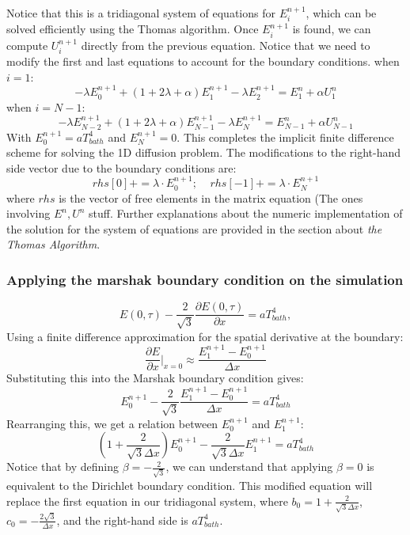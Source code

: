 \documentclass{article}
\begin{document}
Notice that this is a tridiagonal system of equations for $E_i^{n+1}$, 
which can be solved efficiently using the Thomas algorithm. 
Once $E_i^{n+1}$ is found, we can compute $U_i^{n+1}$ directly from the previous equation. 
Notice that we need to modify the first and last equations to account for the boundary conditions.
when $i=1$:
\begin{equation}
    -\lambda E_0^{n+1}+(1 + 2\lambda + \alpha) E_1^{n+1} - \lambda E_2^{n+1} = E_1^n + \alpha U_1^n
\end{equation}
when $i=N-1$:
\begin{equation}
    -\lambda E_{N-2}^{n+1} + (1 + 2\lambda + \alpha) E_{N-1}^{n+1} - \lambda E_N^{n+1} = E_{N-1}^n + \alpha U_{N-1}^n
\end{equation}
With $E_0^{n+1} = aT_{bath}^4$ and $E_N^{n+1} = 0$.
This completes the implicit finite difference scheme for solving the 1D diffusion problem.
The modifications to the right-hand side vector due to the boundary conditions are:
\begin{equation}
rhs[0] += \lambda \cdot E_0^{n+1}; \;\;\;\; rhs[-1] += \lambda \cdot E_N^{n+1}
\end{equation}
where $rhs$ is the vector of free elements in the matrix equation (The ones involving $E^n,U^n$ stuff. 
Further explanations about the numeric implementation of the solution for the system of equations are provided in the section about \textit{the Thomas Algorithm}.
\subsubsection*{Applying the marshak boundary condition on the simulation}
\begin{equation}
E(0,\tau)-  \frac{2}{\sqrt3} \frac{\partial E(0,\tau)}{\partial x} = aT_{bath}^4,
\end{equation}
Using a finite difference approximation for the spatial derivative at the boundary:
\begin{equation}
\frac{\partial E}{\partial x}|_{x=0} \approx \frac{E_1^{n+1} - E_0^{n+1}}{\Delta x}
\end{equation}
Substituting this into the Marshak boundary condition gives:
\begin{equation}
E_0^{n+1} - \frac{2}{\sqrt3} \frac{E_1^{n+1} - E_0^{n+1}}{\Delta x} = aT_{bath}^4
\end{equation}
Rearranging this, we get a relation between $E_0^{n+1}$ and $E_1^{n+1}$:
\begin{equation}
\left(1 + \frac{2}{\sqrt3\Delta x}\right) E_0^{n+1} - \frac{2}{\sqrt3\Delta x} E_1^{n+1} = aT_{bath}^4
\end{equation}
Notice that by defining $\beta = -\frac{2}{\sqrt3}$, we can understand that applying 
$\beta=0$ is equivalent to the Dirichlet boundary condition.
This modified equation will replace the first equation in our tridiagonal system, where 
$b_0 = 1 + \frac{2}{\sqrt3\Delta x}$, $c_0 = -\frac{2\sqrt3}{\Delta x}$, 
and the right-hand side is $aT_{bath}^4$.
\end{document}
